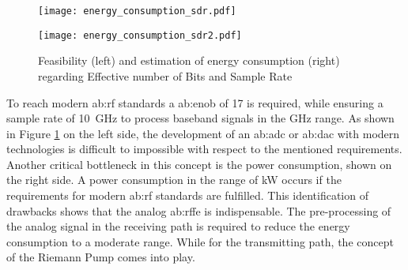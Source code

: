 \begin{figure}[htbp]
	\begin{minipage}{0.49\linewidth} 
	\texttt{[image: energy\_consumption\_sdr.pdf]}
	\end{minipage}
	\hfill
	\begin{minipage}{0.49\linewidth}
	\texttt{[image: energy\_consumption\_sdr2.pdf]}
	\end{minipage}
 \caption{Feasibility (left) and estimation of energy consumption (right) regarding Effective number of Bits and Sample Rate \cite{RivetDevalJ.-B.EtAl2010}}
 \label{fig:feas_energy}
\end{figure}

To reach modern \gls{ab:rf} standards a \gls{ab:enob} of 17 is required, while ensuring a sample rate of \SI{10}{\giga \hertz} to process baseband signals in the \si{\giga \hertz} range.
As shown in Figure \ref{fig:feas_energy} on the left side, the development of an \gls{ab:adc} or \gls{ab:dac} with modern technologies is difficult to impossible with respect to the mentioned requirements.
Another critical bottleneck in this concept is the power consumption, shown on the right side.
A power consumption in the range of \si{\kilo \watt} occurs if the requirements for modern \gls{ab:rf} standards are fulfilled.
This identification of drawbacks shows that the analog \gls{ab:rffe} is indispensable.
The pre-processing of the analog signal in the receiving path is required to reduce the energy consumption to a moderate range.
While for the transmitting path, the concept of the Riemann Pump comes into play.

